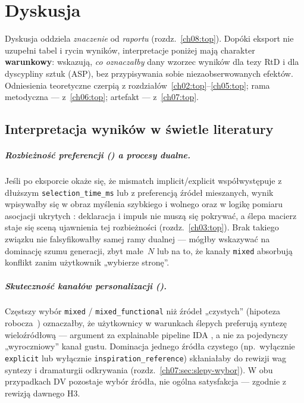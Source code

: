 \chapter{Dyskusja}
\label{ch09:top}

Dyskusja oddziela \emph{znaczenie} od \emph{raportu} (rozdz.~\ref{ch08:top}).
Dopóki eksport nie uzupełni tabel i rycin wyników, interpretacje poniżej mają charakter \textbf{warunkowy}: wskazują, \emph{co oznaczałby} dany wzorzec wyników dla tezy RtD i dla dyscypliny sztuk (ASP), bez przypisywania sobie niezaobserwowanych efektów.
Odniesienia teoretyczne czerpią z rozdziałów~\ref{ch02:top}--\ref{ch05:top}; rama metodyczna --- z~\ref{ch06:top}; artefakt --- z~\ref{ch07:top}.

\section{Interpretacja wyników w świetle literatury}
\label{ch09:sec:interpretacja}

\paragraph{Rozbieżność preferencji () a procesy dualne.}
Jeśli po eksporcie okaże się, że mismatch implicit/explicit współwystępuje z dłuższym \texttt{selection\_time\_ms} lub z preferencją źródeł mieszanych, wynik wpisywałby się w obraz myślenia szybkiego i wolnego oraz w logikę pomiaru asocjacji ukrytych \parencite{kahneman2011thinking,greenwald1998iat}: deklaracja i impuls nie muszą się pokrywać, a ślepa macierz staje się sceną ujawnienia tej rozbieżności (rozdz.~\ref{ch03:top}).
Brak takiego związku nie falsyfikowałby samej ramy dualnej --- mógłby wskazywać na dominację szumu generacji, zbyt małe~$N$ lub na to, że kanały \texttt{mixed} absorbują konflikt zanim użytkownik „wybierze stronę”.

\paragraph{Skuteczność kanałów personalizacji ().}
Częstszy wybór \texttt{mixed} / \texttt{mixed\_functional} niż źródeł „czystych” (hipoteza robocza~) oznaczałby, że użytkownicy w warunkach ślepych preferują syntezę wieloźródłową --- argument za explainable pipeline IDA \parencite{idaPlatform2026}, a nie za pojedynczy „wyroczniowy” kanał gustu.
Dominacja jednego źródła czystego (np.\ wyłącznie \texttt{explicit} lub wyłącznie \texttt{inspiration\_reference}) skłaniałaby do rewizji wag syntezy i dramaturgii odkrywania (rozdz.~\ref{ch07:sec:slepy-wybor}).
W obu przypadkach DV pozostaje wybór źródła, nie ogólna satysfakcja --- zgodnie z rewizją dawnego H3.

